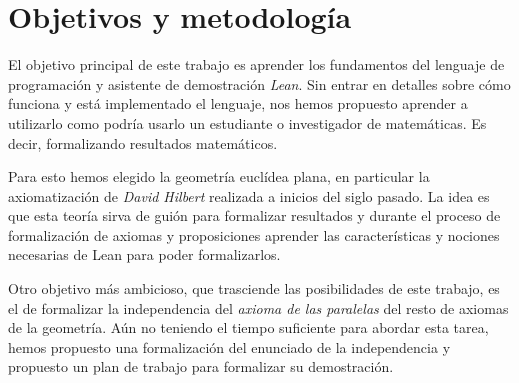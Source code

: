 \section{Objetivos y metodología}

El objetivo principal de este trabajo es aprender los fundamentos del lenguaje
de programación y asistente de demostración \textit{Lean}. Sin entrar en
detalles sobre cómo funciona y está implementado el lenguaje, nos hemos
propuesto aprender a utilizarlo como podría usarlo un estudiante o investigador de
matemáticas. Es decir, formalizando resultados matemáticos.

Para esto hemos elegido la geometría euclídea plana, en particular la
axiomatización de \textit{David Hilbert} realizada a inicios del siglo pasado.
La idea es que esta teoría sirva de guión para formalizar resultados y durante
el proceso de formalización de axiomas y proposiciones aprender las
características y nociones necesarias de Lean para poder formalizarlos.

Otro objetivo más ambicioso, que trasciende las posibilidades de este trabajo,
es el de formalizar la independencia del \textit{axioma de las paralelas} del
resto de axiomas de la geometría. Aún no teniendo el tiempo suficiente para
abordar esta tarea, hemos propuesto una formalización del enunciado de la
independencia y propuesto un plan de trabajo para formalizar su demostración.




